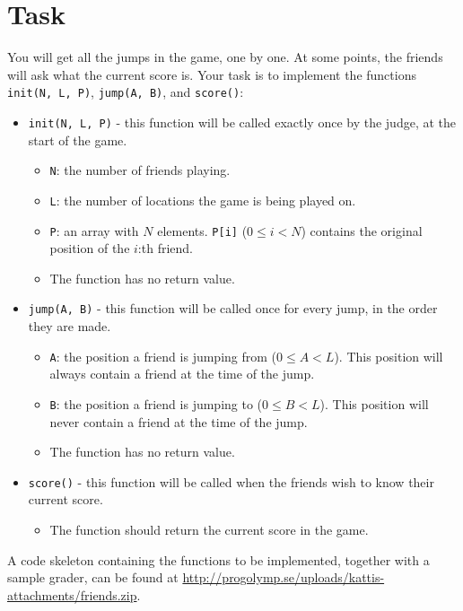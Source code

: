\section*{Task}
You will get all the jumps in the game, one by one. At some points, the friends will ask what the current score is. Your task is to
implement the functions \texttt{init(N, L, P)}, \texttt{jump(A, B)}, and \texttt{score()}:
\begin{itemize}
  \item \texttt{init(N, L, P)} - this function will be called exactly once by the judge, at the start of the game.
  \begin{itemize}
    \item \texttt{N}: the number of friends playing.
    \item \texttt{L}: the number of locations the game is being played on.
    \item \texttt{P}: an array with $N$ elements. \texttt{P[i]} ($0 \le i < N$) contains the original position of the $i$:th friend.
    \item The function has no return value.
  \end{itemize}

  \item \texttt{jump(A, B)} - this function will be called once for every jump, in the order they are made.
  \begin{itemize}
    \item \texttt{A}: the position a friend is jumping from ($0 \le A < L$). This position will always contain a friend at the time of the jump.
    \item \texttt{B}: the position a friend is jumping to ($0 \le B < L$). This position will never contain a friend at the time of the jump.
    \item The function has no return value.
  \end{itemize}

  \item \texttt{score()} - this function will be called when the friends wish to know their current score.
  \begin{itemize}
    \item The function should return the current score in the game.
  \end{itemize}

\end{itemize}

A code skeleton containing the functions to be implemented, together with a sample grader, can be found at
\url{http://progolymp.se/uploads/kattis-attachments/friends.zip}.

